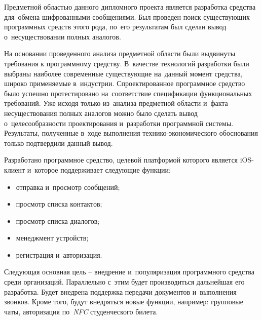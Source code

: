 
Предметной областью данного дипломного проекта является разработка средства для~обмена шифрованными сообщениями. Был проведен поиск существующих программных средств этого рода, по~его результатам был сделан вывод о~несуществовании полных аналогов.

На основании проведенного анализа предметной области были выдвинуты требования к программному средству. В~качестве технологий разработки были выбраны наиболее современные существующие на~данный момент средства, широко применяемые в~индустрии. Спроектированное программное средство было успешно протестировано на~соответствие спецификации функциональных требований. Уже исходя только из~анализа предметной области и~факта несуществования полных аналогов можно было сделать вывод о~целесообразности проектирования и~разработки программной системы. Результаты, полученные в~ходе выполнения технико-экономического обоснования только подтвердили данный вывод.

Разработано программное средство, целевой платформой которого является iOS-клиент и~которое поддерживает следующие функции:
\begin{itemize}
	\item отправка и~просмотр сообщений;
	\item просмотр списка контактов;
	\item просмотр списка диалогов;
	\item менеджмент устройств;
	\item регистрация и~авторизация.
\end{itemize}

Следующая основная цель -- внедрение и~популяризация программного средства среди организаций. Параллельно с~этим будет производиться дальнейшая его разработка. Будет внедрена поддержка передачи документов и~выполнения звонков. Кроме того, будут внедряться новые функции, например: групповые чаты, авторизация по~\textit{NFC} студенческого билета.